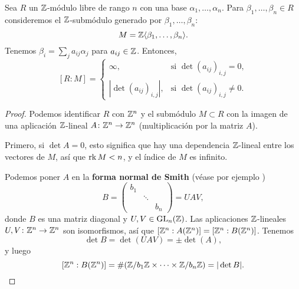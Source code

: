 \begin{lema}
  \label{lema:indice-de-Z-submodulo-como-determinante}
  Sea $R$ un $\mathbb{Z}$-módulo libre de rango $n$ con una base
  $\alpha_1,\ldots,\alpha_n$. Para $\beta_1,\ldots,\beta_n \in R$
  consideremos el $\mathbb{Z}$-submódulo generado por $\beta_1,\ldots,\beta_n$:
  $$M = \mathbb{Z} \langle\beta_1,\ldots,\beta_n\rangle.$$
  Tenemos $\beta_i = \sum_j a_{ij} \alpha_j$ para $a_{ij} \in \mathbb{Z}$.
  Entonces,
  \[ [R : M] = \begin{cases}
    \infty, & \text{si }\det (a_{ij})_{i,j} = 0, \\
    |\det (a_{ij})_{i,j}|, & \text{si }\det (a_{ij})_{i,j} \ne 0.
    \end{cases} \]

  \begin{proof}
    Podemos identificar $R$ con $\mathbb{Z}^n$ y el submódulo $M \subset R$
    con la imagen de una aplicación $\mathbb{Z}$-lineal $A\colon\mathbb{Z}^n \to \mathbb{Z}^n$
    (multiplicación por la matriz $A$).

    Primero, si $\det A = 0$, esto significa que hay una dependencia
    $\mathbb{Z}$-lineal entre los vectores de $M$, así que $\operatorname{rk} M < n$,
    y el índice de $M$ es infinito.

    Podemos poner $A$ en la \textbf{forma normal de Smith} (véase
    por ejemplo \cite[Chapter 2]{Cohen-GTM138})
    \[ B = \begin{pmatrix}
      b_1 \\
      & \ddots \\
      & & b_n
      \end{pmatrix} = U A V, \]
    donde $B$ es una matriz diagonal y $U, V \in \operatorname{GL}_n (\mathbb{Z})$.
    Las aplicaciones $\mathbb{Z}$-lineales $U, V\colon \mathbb{Z}^n\to \mathbb{Z}^n$ son
    isomorfismos, así que $[\mathbb{Z}^n : A (\mathbb{Z}^n)] = [\mathbb{Z}^n : B (\mathbb{Z}^n)]$.
    Tenemos
    $$\det B = \det (U A V) = \pm\det (A),$$
    y luego
    \[ [\mathbb{Z}^n : B (\mathbb{Z}^n)] = \# (\mathbb{Z}/b_1\mathbb{Z} \times \cdots \times \mathbb{Z}/b_n\mathbb{Z})
       = |\det B|. \qedhere \]
  \end{proof}
\end{lema}

